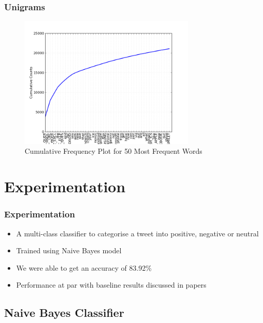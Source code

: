 \documentclass{beamer}
\begin{document}

\begin{frame}
\frametitle{Unigrams}

\begin{figure}[h]
\centering
\includegraphics[width=0.75\textwidth]{img/fdist-unigrams.png}
\caption{Cumulative Frequency Plot for 50 Most Frequent Words}
\label{fig:unigrams}
\end{figure}

\end{frame}

\section{Experimentation}

\begin{frame}
\frametitle{Experimentation}
\begin{itemize}
\item A multi-class classifier to categorise a tweet into positive, negative or neutral
\item Trained using Naive Bayes model
\item We were able to get an accuracy of 83.92\%
\item Performance at par with baseline results discussed in papers
\end{itemize}
\end{frame}

\subsection{Naive Bayes Classifier}
\end{document}
